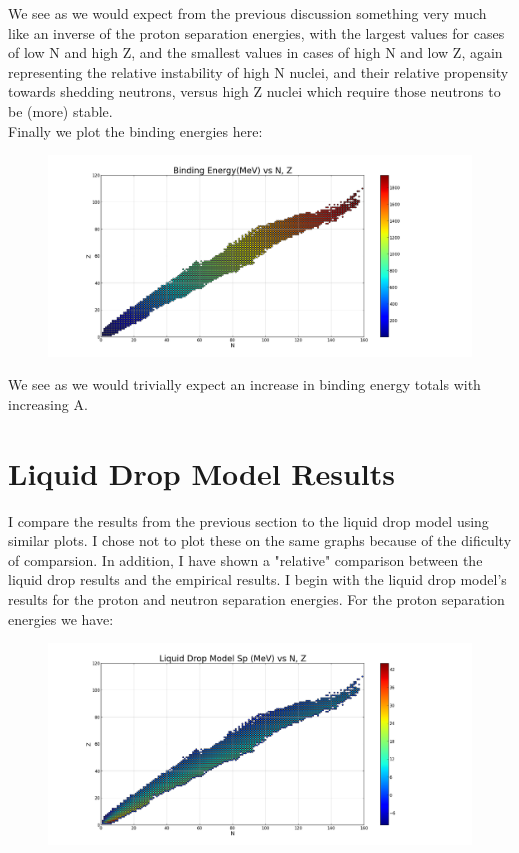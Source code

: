 \documentclass[11pt]{article} %
\begin{document}
We see as we would expect from the previous discussion something very much like an inverse of the proton separation energies, with the largest values for cases of low N and high Z, and the smallest values in cases of high N and low Z, again representing the relative instability of high N nuclei, and their relative propensity towards shedding neutrons, versus high Z nuclei which require those neutrons to be (more) stable.\\

Finally we plot the binding energies here:\\

\begin{figure}[htbp]
\centering
\includegraphics[width=.7\linewidth]{"BindingEnergy"}
\end{figure}

We see as we would trivially expect an increase in binding energy totals with increasing A.



\section{Liquid Drop Model Results}

I compare the results from the previous section to the liquid drop model using similar plots. I chose not to plot these on the same graphs because of the dificulty of comparsion. In addition, I have shown a "relative" comparison between the liquid drop results and the empirical results. I begin with the liquid drop model's results for the proton and neutron separation energies.
For the proton separation energies we have:\\
\begin{figure}[htbp]
\centering
\includegraphics[width=.7\linewidth]{"LiquidDropProtonSepEnergy"}
\end{figure}
\end{document}
